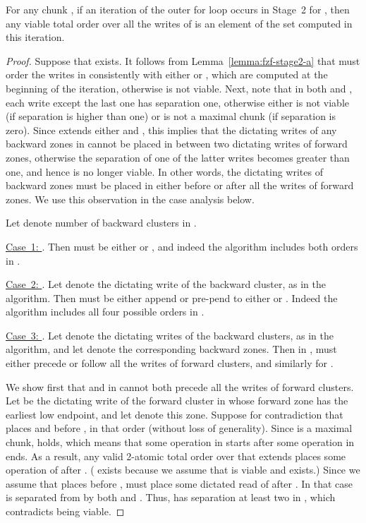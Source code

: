\begin{lemma}
\label{lemma:fzf-stage2-b}
For any chunk , if an iteration of the outer for loop occurs in Stage~2 for , then
any viable total order  over all the writes of  is an element
of the set  computed in this iteration.
\begin{proof}
Suppose that  exists.
It follows from Lemma~\ref{lemma:fzf-stage2-a} that  must order the writes in 
consistently with either  or , which are computed at the beginning of the iteration,
otherwise  is not viable.
Next, note that in both  and , each write except the last one has separation one,
otherwise either  is not viable (if separation is higher than one) or  is not a
maximal chunk (if separation is zero).
Since  extends either  and , this implies that
the dictating writes of any backward zones in  cannot be placed in  between
two dictating writes of forward zones, otherwise the separation of one of the latter writes
becomes greater than one, and hence  is no longer viable.
In other words, the dictating writes of backward zones must be placed in  either before
or after all the writes of forward zones.
We use this observation in the case analysis below.

Let  denote number of backward clusters in .

\noindent\underline{Case~1: }.
Then  must be either  or , and indeed the algorithm includes both
orders in .

\noindent\underline{Case~2: }.
Let  denote the dictating write of the backward cluster, as in the algorithm.
Then  must be either append or pre-pend  to either  or .
Indeed the algorithm includes all four possible orders in .

\noindent\underline{Case~3: }.
Let  denote the dictating writes of the backward clusters, as in the algorithm,
and let  denote the corresponding backward zones.
Then in ,  must either precede or follow all the writes of forward clusters,
and similarly for .

We show first that  and  in  cannot both precede all the writes of forward clusters.
Let  be the dictating write of the forward cluster in  whose forward zone has the earliest low endpoint,
and let  denote this zone.
Suppose for contradiction that  places  and  before , in that order (without loss of generality).
Since  is a maximal chunk,  holds, which means that some operation in 
starts after some operation in  ends.
As a result, any valid 2-atomic total order  over  that extends  places some operation of  after .
( exists because we assume that  is viable and exists.)
Since we assume that  places  before ,  must place some dictated read  of  after .
In that case  is separated from  by both  and .
Thus,  has separation at least two in ,
which contradicts  being viable.


\end{proof}
\end{lemma}
